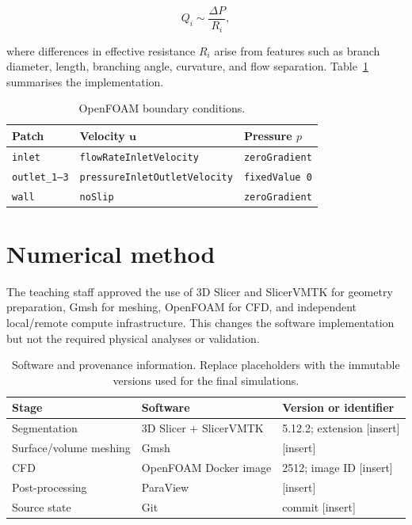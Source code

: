 \documentclass[11pt,a4paper]{article}
\begin{document}
\begin{equation}
  Q_i \sim \frac{\Delta P}{R_i},
\end{equation}

where differences in effective resistance $R_i$ arise from features such as
branch diameter, length, branching angle, curvature, and flow separation.
Table~\ref{tab:bc} summarises the implementation.

\begin{table}[htbp]
  \centering
  \caption{OpenFOAM boundary conditions.}
  \label{tab:bc}
  \begin{tabular}{@{}lll@{}}
    \toprule
    Patch & Velocity $\mathbf{u}$ & Pressure $p$ \\
    \midrule
    \texttt{inlet} & \texttt{flowRateInletVelocity} & \texttt{zeroGradient} \\
    \texttt{outlet\_1--3} & \texttt{pressureInletOutletVelocity} & \texttt{fixedValue 0} \\
    \texttt{wall} & \texttt{noSlip} & \texttt{zeroGradient} \\
    \bottomrule
  \end{tabular}
\end{table}

\section{Numerical method}
\label{sec:numerics}

The teaching staff approved the use of 3D Slicer and SlicerVMTK for geometry
preparation, Gmsh for meshing, OpenFOAM for CFD, and independent local/remote
compute infrastructure. This changes the software implementation but not the
required physical analyses or validation.

\begin{table}[htbp]
  \centering
  \caption{Software and provenance information. Replace placeholders with the
  immutable versions used for the final simulations.}
  \label{tab:software}
  \begin{tabular}{@{}lll@{}}
    \toprule
    Stage & Software & Version or identifier \\
    \midrule
    Segmentation & 3D Slicer + SlicerVMTK & 5.12.2; extension [insert] \\
    Surface/volume meshing & Gmsh & [insert] \\
    CFD & OpenFOAM Docker image & 2512; image ID [insert] \\
    Post-processing & ParaView & [insert] \\
    Source state & Git & commit [insert] \\
    \bottomrule
  \end{tabular}
\end{table}
\end{document}
